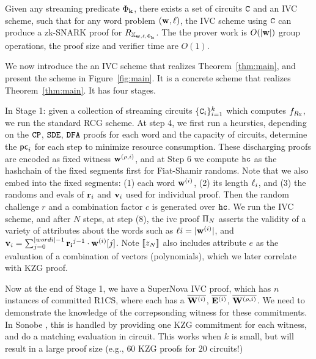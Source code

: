 \begin{theorem} \label{thm:main}
Given any streaming predicate $\Phi_{{{\mathbf {k}}}}$, there exists 
a set of circuits ${{\mathbf {{\texttt{C}}}}}$ and an IVC scheme, 
such that for any word problem
$({{\mathbf {w}}}, {{\mathbf {\ell}}})$, the IVC scheme using ${{\mathbf {{\texttt{C}}}}}$
can produce a zk-SNARK proof 
for $R_{\mathbb{X}_{{{\mathbf {w}}}, {{\mathbf {\ell}}}, \Phi_{{{\mathbf {k}}}}}}$.
The the prover work is $O(|{{\mathbf {w}}}|)$ group operations, 
the proof size and verifier time are $O(1)$. 
\end{theorem}

We now introduce the an IVC scheme that realizes Theorem\ \ref{thm:main},
and present the scheme in Figure\ \ref{fig:main}. It is a concrete
scheme that realizes Theorem\ \ref{thm:main}. It has four stages.

In Stage 1: given a collection of streaming circuits $\{{\texttt{C}}_i\}_{i=1}^k$
which computes $f_{R_{\mathbb{X}}}$, we run the standard RCG scheme. 
At step 4, we first run a heurstics, depending on the $\texttt{CP}$, $\texttt{SDE}$, $\texttt{DFA}$
proofs for each word and the capacity of circuits, determine the 
$\mathsf{pc}_i$ for each step to minimize resource consumption. These discharging
proofs are encoded as fixed witness ${{\mathbf {w}}}^{(\rho,i)}$, and at Step 6
we compute $\texttt{hc}$ as the hashchain of the fixed segments first for
Fiat-Shamir randoms.  Note that we also embed into the fixed segments:
(1) each word ${{\mathbf {w}}}^{(i)}$, (2) its length ${{\mathbf {\ell}}}_i$, and (3)
the randoms and evals of ${{\mathbf {r}}}_i$ and ${{\mathbf {v}}}_i$ used for
individual proof. Then the random challenge $r$ and a combination 
factor $c$ is generated over $\texttt{hc}$. We run the IVC scheme, and after
$N$ steps, at step (8), the ivc proof
${\Pi}_N$ asserts the validity of a variety of attributes
about the words such as ${{\mathbf {\ell}}}{i} = |{{\mathbf {w}}}^{(i)}|$, and
${{\mathbf {v}}}_i = \sum_{j=0}^{|word{i}|-1} {{\mathbf {r_i}}}^{j-1} \cdot {{\mathbf {w}}}^{(i)}[j]$.
Note $[\![z_N]\!]$ also includes attribute $e$ as the
evaluation of a combination of vectors (polynomials), which 
we later correlate with KZG proof.

Now at the end of Stage 1, we have a SuperNova IVC proof, which has
$n$ instances of committed R1CS, where each has a
$\overline{{{\mathbf {W}}}^{(i)}}$,
$\overline{{{\mathbf {E}}}^{(i)}}$,
$\overline{{{\mathbf {W}}}^{(\rho, i)}}$. We need to demonstrate the knowledge
of the correpsonding witness for these commitments. In
Sonobe \cite{Sonobe}, this is handled by providing one KZG commitment
for each witness, and do a matching evaluation in circuit. This works
when $k$ is small, but will result in a large proof size (e.g., $60$ KZG
proofs for $20$ circuits!)

